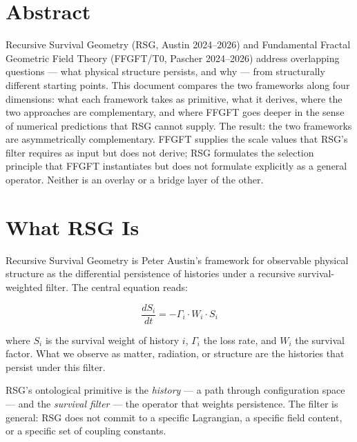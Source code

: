 
\section*{Abstract}

Recursive Survival Geometry (RSG, Austin 2024--2026) and Fundamental Fractal
Geometric Field Theory (FFGFT/T0, Pascher 2024--2026) address overlapping
questions — what physical structure persists, and why — from structurally
different starting points. This document compares the two frameworks along
four dimensions: what each framework takes as primitive, what it derives,
where the two approaches are complementary, and where FFGFT goes deeper in
the sense of numerical predictions that RSG cannot supply. The result: the
two frameworks are asymmetrically complementary. FFGFT supplies the scale
values that RSG's filter requires as input but does not derive; RSG
formulates the selection principle that FFGFT instantiates but does not
formulate explicitly as a general operator. Neither is an overlay or a bridge
layer of the other.

\section{What RSG Is}

Recursive Survival Geometry is Peter Austin's framework for observable
physical structure as the differential persistence of histories under a
recursive survival-weighted filter. The central equation reads:

\begin{equation}
  \frac{dS_i}{dt} = -\Gamma_i \cdot W_i \cdot S_i
\end{equation}

where $S_i$ is the survival weight of history $i$, $\Gamma_i$ the loss rate,
and $W_i$ the survival factor. What we observe as matter, radiation, or
structure are the histories that persist under this filter.

RSG's ontological primitive is the \emph{history} — a path through
configuration space — and the \emph{survival filter} — the operator that
weights persistence. The filter is general: RSG does not commit to a
specific Lagrangian, a specific field content, or a specific set of coupling
constants.

